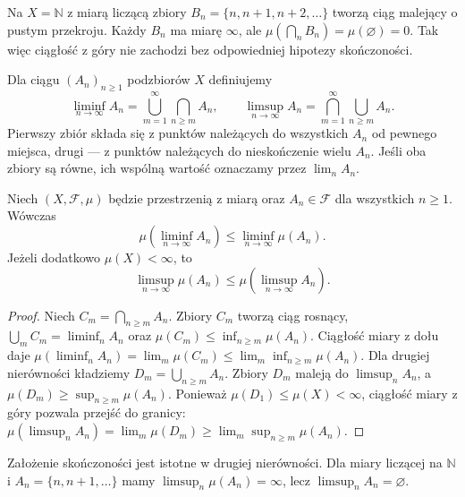 \begin{przyklad}
\label{ex:continuity-counterexample}
Na $X=\mathbb N$ z miarą liczącą zbiory
$B_n=\{n,n+1,n+2,\ldots\}$ tworzą ciąg malejący o pustym
przekroju. Każdy $B_n$ ma miarę $\infty$, ale
$\mu(\bigcap_nB_n)=\mu(\varnothing)=0$.
Tak więc ciągłość z góry nie zachodzi bez odpowiedniej
hipotezy skończoności.
\end{przyklad}

\begin{definicja}
\label{def:limsup-sets}
Dla ciągu $(A_n)_{n\geq1}$ podzbiorów $X$ definiujemy
\[
\liminf_{n\to\infty}A_n
=\bigcup_{m=1}^{\infty}\bigcap_{n\geq m}A_n,
\qquad
\limsup_{n\to\infty}A_n
=\bigcap_{m=1}^{\infty}\bigcup_{n\geq m}A_n.
\]
Pierwszy zbiór składa się z punktów należących do wszystkich
$A_n$ od pewnego miejsca, drugi --- z punktów należących do
nieskończenie wielu $A_n$. Jeśli oba zbiory są równe,
ich wspólną wartość oznaczamy przez $\lim_nA_n$.
\end{definicja}

\begin{twierdzenie}
\label{thm:fatou-for-sets}
Niech $(X,\mathcal F,\mu)$ będzie przestrzenią z miarą
oraz $A_n\in\mathcal F$ dla wszystkich $n\ge1$.
Wówczas
\[
 \mu(\liminf_{n\to\infty}A_n)
 \le \liminf_{n\to\infty}\mu(A_n).
\]
Jeżeli dodatkowo $\mu(X)<\infty$, to
\[
 \limsup_{n\to\infty}\mu(A_n)
 \le \mu(\limsup_{n\to\infty}A_n).
\]
\end{twierdzenie}
\begin{proof}
Niech $C_m=\bigcap_{n\ge m}A_n$.
Zbiory $C_m$ tworzą ciąg rosnący,
$\bigcup_m C_m=\liminf_n A_n$ oraz
$\mu(C_m)\le\inf_{n\ge m}\mu(A_n)$.
Ciągłość miary z dołu daje
$\mu(\liminf_n A_n)=\lim_m\mu(C_m)
\le\lim_m\inf_{n\ge m}\mu(A_n)$.
Dla drugiej nierówności kładziemy
$D_m=\bigcup_{n\ge m}A_n$.
Zbiory $D_m$ maleją do $\limsup_n A_n$,
a $\mu(D_m)\ge\sup_{n\ge m}\mu(A_n)$.
Ponieważ $\mu(D_1)\le\mu(X)<\infty$,
ciągłość miary z góry pozwala przejść do granicy:
$\mu(\limsup_n A_n)=\lim_m\mu(D_m)
\ge\lim_m\sup_{n\ge m}\mu(A_n)$.
\end{proof}
\begin{uwaga}
Założenie skończoności jest istotne w drugiej nierówności.
Dla miary liczącej na $\mathbb N$ i
$A_n=\{n,n+1,\ldots\}$ mamy
$\limsup_n\mu(A_n)=\infty$, lecz
$\limsup_n A_n=\varnothing$.
\end{uwaga}

